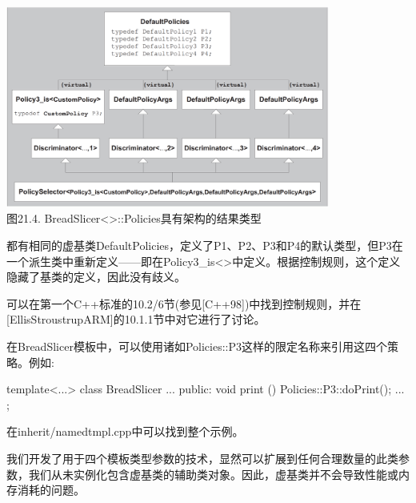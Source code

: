 \begin{center}
\includegraphics[width=0.8\textwidth]{part3/ch21/images/4.png} \\
图21.4. BreadSlicer<>::Policies具有架构的结果类型
\end{center}

都有相同的虚基类DefaultPolicies，定义了P1、P2、P3和P4的默认类型，但P3在一个派生类中重新定义——即在Policy3\_is<>中定义。根据控制规则，这个定义隐藏了基类的定义，因此没有歧义。

\begin{notice}
可以在第一个C++标准的10.2/6节(参见[C++98])中找到控制规则，并在[EllisStroustrupARM]的10.1.1节中对它进行了讨论。
\end{notice}

在BreadSlicer模板中，可以使用诸如Policies::P3这样的限定名称来引用这四个策略。例如:

\begin{cpp}
template<...>
class BreadSlicer {
	...
	public:
	void print () {
		Policies::P3::doPrint();
	}
	...
};
\end{cpp}

在inherit/namedtmpl.cpp中可以找到整个示例。

我们开发了用于四个模板类型参数的技术，显然可以扩展到任何合理数量的此类参数，我们从未实例化包含虚基类的辅助类对象。因此，虚基类并不会导致性能或内存消耗的问题。






